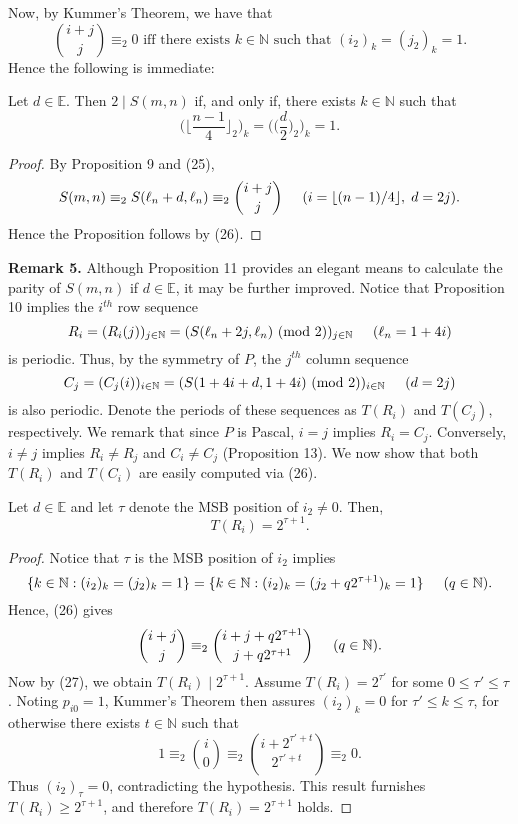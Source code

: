 \documentclass[]{amsart}
\begin{document}
Now, by Kummer's Theorem, we have that
\begin{equation}
{i+j\choose j} \equiv_{2} 0 \mbox{ iff there exists $k \in \mathbb{N}$ such that $(i_{2})_{k} = (j_{2})_{k} = 1$}.
\end{equation}
Hence the following is immediate:
\begin{prop}
Let $d \in \mathbb{E}$.  Then $2 \mid S(m,n)$ if, and only if, there exists $k \in \mathbb{N}$ such that
\[ \bigg( \bigg\lfloor \frac{n-1}{4} \bigg\rfloor_{2}\bigg)_{k} = \bigg(\bigg(\frac{d}{2}\bigg)_{2}\bigg)_{k} = 1.\]
\end{prop}
\begin{proof}
By Proposition 9 and (25),
\[ S(m,n) \equiv_{2} S(\ell_{n}+d,\ell_{n}) \equiv_{2} {i+j \choose j} \hspace{5mm} (i = \lfloor(n-1)/4\rfloor,\hspace{1mm} d = 2j). \]
Hence the Proposition follows by (26).
\end{proof}
\noindent
\textbf{Remark 5.}  Although Proposition 11 provides an elegant means to calculate the parity of $S(m,n)$ if $d \in \mathbb{E}$, it may be further improved. Notice that Proposition 10 implies the $i^{th}$ row sequence 
\[ R_{i} = (R_{i}(j))_{j \in \mathbb{N}} = (S(\ell_{n}+2j,\ell_{n}) \mbox{ (mod $2$)})_{j \in \mathbb{N}} \hspace{5mm} (\ell_{n} = 1 + 4i) \]
is periodic.  Thus, by the symmetry of $P$, the $j^{th}$ column sequence 
\[ C_{j} = (C_{j}(i))_{i \in \mathbb{N}} = (S(1+4i+d,1+4i) \mbox{ (mod $2$)})_{i \in \mathbb{N}} \hspace{5mm} (d=2j) \]
is also periodic.  Denote the periods of these sequences as $T(R_{i})$ and $T(C_{j})$, respectively.  We remark that since $P$ is Pascal, $i = j$ implies $R_{i} = C_{j}$.  Conversely, $i \neq j$ implies $R_{i} \neq R_{j}$ and $C_{i} \neq C_{j}$ (Proposition 13).  We now show that both $T(R_{i})$ and $T(C_{i})$ are easily computed via (26).
\begin{prop}
Let $d \in \mathbb{E}$ and let $\tau$ denote the MSB position of $i_{2} \neq 0$. Then, 
\[T(R_{i}) = 2^{\tau+1}.\]
\end{prop}
\begin{proof}
Notice that $\tau$ is the MSB position of $i_{2}$ implies
\[ \{k \in \mathbb{N} : (i_{2})_{k} = (j_{2})_{k} = 1\} = \{k \in \mathbb{N} : (i_{2})_{k} = (j_{2} + q2^{\tau+1})_{k} = 1\} \hspace{5mm} (q \in \mathbb{N}). \]
Hence, (26) gives
\begin{equation}
{i+j\choose j} \equiv_{2} {i+j+q2^{\tau+1} \choose j+q2^{\tau+1}} \hspace{5mm} (q \in \mathbb{N}).
\end{equation}
Now by (27), we obtain $T(R_{i}) \mid 2^{\tau+1}$.  Assume $T(R_{i}) = 2^{\tau'}$ for some $0 \leq \tau' \leq \tau$.  Noting $p_{i0} = 1$, Kummer's Theorem then assures $(i_{2})_{k} = 0$ for $\tau' \leq k \leq \tau$, for otherwise there exists $t \in \mathbb{N}$ such that
\[ 1 \equiv_{2} {i\choose 0} \equiv_{2} {i+2^{\tau'+ t}\choose 2^{\tau'+ t}} \equiv_{2} 0. \]
Thus $(i_{2})_{\tau} = 0$, contradicting the hypothesis.  This result furnishes $T(R_{i}) \geq 2^{\tau+1}$, and therefore $T(R_{i}) = 2^{\tau+1}$ holds.
\end{proof}
\end{document}
